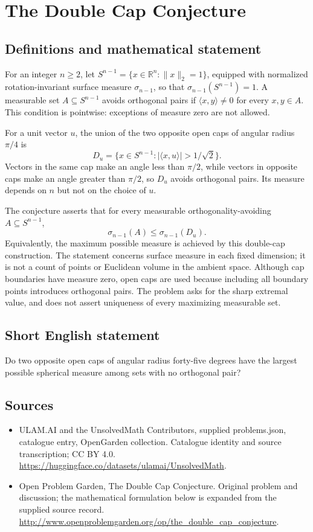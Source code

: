 \documentclass[11pt,a4paper]{article}
\begin{document}
\section*{The Double Cap Conjecture}\label{statement}

\subsection{Definitions and mathematical statement}
For an integer $n\ge2$, let
$S^{n-1}=\{x\in\mathbb R^n:\|x\|_2=1\}$, equipped with normalized
rotation-invariant surface measure $\sigma_{n-1}$, so that
$\sigma_{n-1}(S^{n-1})=1$. A measurable set $A\subseteq S^{n-1}$ avoids
orthogonal pairs if $\langle x,y\rangle\ne0$ for every $x,y\in A$.
This condition is pointwise: exceptions of measure zero are not allowed.

For a unit vector $u$, the union of the two opposite open caps of angular
radius $\pi/4$ is
\[
 D_u=\{x\in S^{n-1}:|\langle x,u\rangle|>1/\sqrt2\}.
\]
Vectors in the same cap make an angle less than $\pi/2$, while vectors
in opposite caps make an angle greater than $\pi/2$, so $D_u$ avoids
orthogonal pairs. Its measure depends on $n$ but not on the choice of $u$.

The conjecture asserts that for every measurable orthogonality-avoiding
$A\subseteq S^{n-1}$,
\[
 \sigma_{n-1}(A)\le\sigma_{n-1}(D_u).
\]
Equivalently, the maximum possible measure is achieved by this double-cap
construction. The statement concerns surface measure in each fixed
dimension; it is not a count of points or Euclidean volume in the ambient
space. Although cap boundaries have measure zero, open caps are used because
including all boundary points introduces orthogonal pairs. The problem
asks for the sharp extremal value, and does not assert uniqueness of every
maximizing measurable set.
\subsection{Short English statement}
Do two opposite open caps of angular radius forty-five degrees have the largest possible spherical measure among sets with no orthogonal pair?
\subsection{Sources}
\begin{itemize}
\item[S1] ULAM.AI and the UnsolvedMath Contributors, supplied problems.json, catalogue entry, OpenGarden collection. Catalogue identity and source transcription; CC BY 4.0.
\url{https://huggingface.co/datasets/ulamai/UnsolvedMath}.
\item[S2] Open Problem Garden, The Double Cap Conjecture. Original problem and discussion; the mathematical formulation below is expanded from the supplied source record.
\url{http://www.openproblemgarden.org/op/the_double_cap_conjecture}.
\end{itemize}
\end{document}
